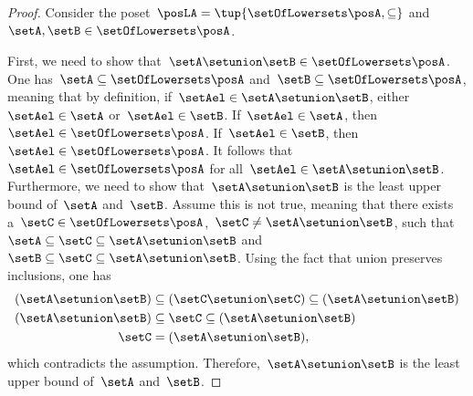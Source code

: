 \begin{proof}
    Consider the poset~$\posLA=\tup{\setOfLowersets \posA,\subseteq}$ and~$\setA,\setB\in \setOfLowersets \posA$.

    First, we need to show that~$\setA\setunion \setB\in \setOfLowersets \posA$.
    One has~$\setA \subseteq \setOfLowersets \posA$ and~$\setB\subseteq \setOfLowersets \posA$, meaning that by definition, if~$\setAel\in \setA\setunion \setB$, either~$\setAel\in \setA$ or~$\setAel\in \setB$.
    If~$\setAel\in \setA$, then~$\setAel\in \setOfLowersets \posA$.
    If~$\setAel\in \setB$, then~$\setAel\in \setOfLowersets \posA$.
    It follows that~$\setAel\in \setOfLowersets \posA$ for all~$\setAel\in \setA\setunion \setB$.
    Furthermore, we need to show that~$\setA\setunion \setB$ is the least upper bound of~$\setA$ and~$\setB$.
    Assume this is not true, meaning that there exists a~$\setC\in \setOfLowersets \posA$,~$\setC\neq \setA\setunion \setB$, such that~$\setA\subseteq \setC\subseteq \setA\setunion \setB$ and~$\setB\subseteq \setC\subseteq \setA\setunion \setB$.
    Using the fact that union preserves inclusions, one has
    \begin{equation}
        \begin{aligned}
            (\setA\setunion \setB)
                                   & \subseteq (\setC\setunion \setC) \subseteq (\setA\setunion \setB) \\
            (\setA\setunion \setB) & \subseteq \setC \subseteq (\setA\setunion \setB)                  \\
            \setC                  & = (\setA\setunion \setB),
        \end{aligned}
    \end{equation}
    which contradicts the assumption.
    Therefore,~$\setA\setunion \setB$ is the least upper bound of~$\setA$ and~$\setB$.


\end{proof}
